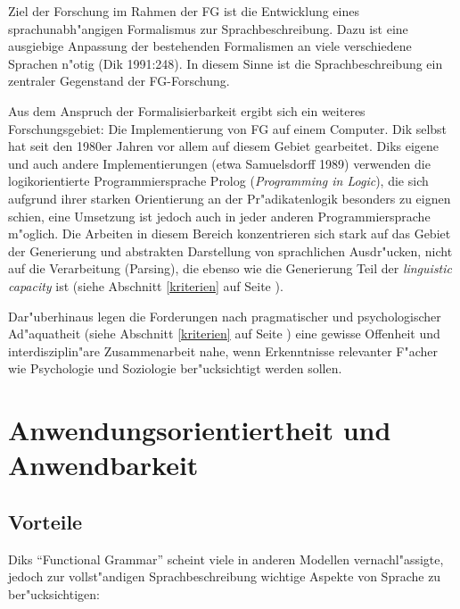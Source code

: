 \documentclass[a4paper]{article}
\begin{document}
Ziel der Forschung im Rahmen der FG ist die Entwicklung eines
sprachunabh"angigen Formalismus zur Sprachbeschreibung. Dazu ist eine
ausgiebige Anpassung der bestehenden Formalismen an viele verschiedene Sprachen
n"otig (Dik 1991:248). In diesem Sinne ist die Sprachbeschreibung ein zentraler
Gegenstand der FG-Forschung.

Aus dem Anspruch der Formalisierbarkeit ergibt sich ein weiteres
Forschungsgebiet: Die Implementierung von FG auf einem Computer. Dik selbst hat
seit den 1980er Jahren vor allem auf diesem Gebiet gearbeitet. Diks eigene und
auch andere Implementierungen (etwa Samuelsdorff 1989) verwenden die
logikorientierte Programmiersprache Prolog (\emph{Programming in Logic}), die
sich aufgrund ihrer starken Orientierung an der Pr"adikatenlogik besonders zu
eignen schien, eine Umsetzung ist jedoch auch in jeder anderen
Programmiersprache m"oglich. Die Arbeiten in diesem Bereich konzentrieren sich
stark auf das Gebiet der Generierung und abstrakten Darstellung von
sprachlichen Ausdr"ucken, nicht auf die Verarbeitung (Parsing), die ebenso wie
die Generierung Teil der \emph{linguistic capacity} ist (siehe Abschnitt
\ref{kriterien} auf Seite \pageref{kriterien}).

Dar"uberhinaus legen die Forderungen nach pragmatischer und psychologischer
Ad"aquatheit (siehe Abschnitt \ref{kriterien} auf Seite \pageref{kriterien})
eine gewisse Offenheit und interdisziplin"are Zusammenarbeit nahe, wenn
Erkenntnisse relevanter F"acher wie Psychologie und Soziologie ber"ucksichtigt
werden sollen.

\section{Anwendungsorientiertheit und Anwendbarkeit}

\subsection{Vorteile}

Diks ``Functional Grammar'' scheint viele in anderen Modellen vernachl"assigte,
jedoch zur vollst"andigen Sprachbeschreibung wichtige Aspekte von Sprache zu
ber"ucksichtigen:
\end{document}
